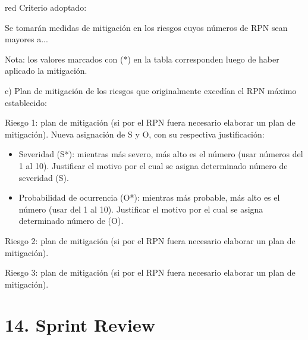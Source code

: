 \documentclass[
11pt, %
]{charter}
\begin{document}
\begin{consigna}{red}
Criterio adoptado: 

Se tomarán medidas de mitigación en los riesgos cuyos números de RPN sean mayores a...

Nota: los valores marcados con (*) en la tabla corresponden luego de haber aplicado la mitigación.

c) Plan de mitigación de los riesgos que originalmente excedían el RPN máximo establecido:
 
Riesgo 1: plan de mitigación (si por el RPN fuera necesario elaborar un plan de mitigación).
  Nueva asignación de S y O, con su respectiva justificación:
  \begin{itemize}
	\item Severidad (S*): mientras más severo, más alto es el número (usar números del 1 al 10).
          Justificar el motivo por el cual se asigna determinado número de severidad (S).
	\item Probabilidad de ocurrencia (O*): mientras más probable, más alto es el número (usar del 1 al 10).
          Justificar el motivo por el cual se asigna determinado número de (O).
	\end{itemize}

Riesgo 2: plan de mitigación (si por el RPN fuera necesario elaborar un plan de mitigación).
 
Riesgo 3: plan de mitigación (si por el RPN fuera necesario elaborar un plan de mitigación).

\end{consigna} %


\section{14. Sprint Review}
\label{sec:sprint_review}
\end{document}
